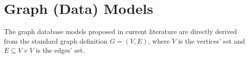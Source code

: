
\section{Graph (Data) Models}\label{sec:datamodelglit}
The graph database models proposed in current literature are directly derived from the standard graph definition $G=(V,E)$,
where $V$ is the vertices' set and $E\subseteq V\times V$ is the edges' set.







